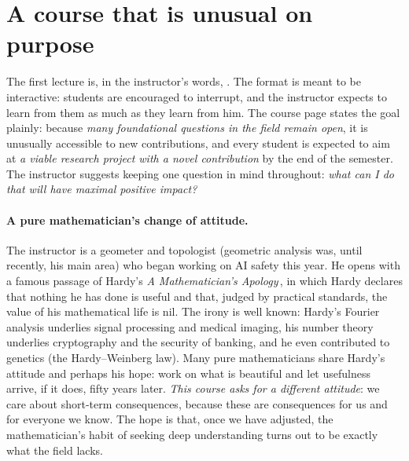 \section{A course that is unusual on purpose}\label{sec:L1-intro}
The first lecture is, in the instructor's words, . The format is meant to be interactive:
students are encouraged to interrupt, and the instructor expects to learn from them as much as they learn from him. The course page states the goal
plainly: because \emph{many foundational questions in the field remain open}, it is unusually accessible to new contributions, and every student is expected to
aim at \emph{a viable research project with a novel contribution} by the end of the semester. The instructor suggests keeping one question in mind
throughout: \emph{what can I do that will have maximal positive impact?}

\paragraph{A pure mathematician's change of attitude.}
The instructor is a geometer and topologist (geometric analysis was, until recently, his main area) who began working on AI safety this year.
He opens with a famous passage of Hardy's \emph{A Mathematician's Apology}\,\citep{hardy1940}, in which Hardy declares that nothing he has done is useful and
that, judged by practical standards, the value of his mathematical life is nil. The irony is well known: Hardy's Fourier analysis underlies signal
processing and medical imaging, his number theory underlies cryptography and the security of banking, and he even contributed to genetics (the
Hardy--Weinberg law). Many pure mathematicians share Hardy's attitude and perhaps his hope: work on what is beautiful and let usefulness arrive,
if it does, fifty years later. \emph{This course asks for a different attitude}: we care about short-term consequences, because these are consequences
for us and for everyone we know. The hope is that, once we have adjusted, the mathematician's habit of seeking deep understanding turns out to be exactly
what the field lacks.

